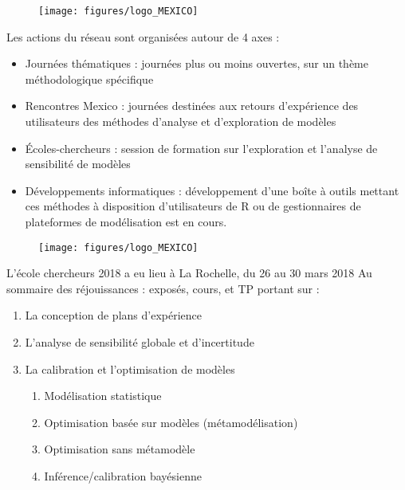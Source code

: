 \documentclass[10pt]{beamer}
\begin{document}
\begin{frame}{}

\begin{figure}
	\centering
	\texttt{[image: figures/logo\_MEXICO]}
	\label{fig:logomexico}
\end{figure}

Les actions du réseau sont organisées autour de 4 axes :

\begin{itemize}
	\item Journées thématiques : journées plus ou moins ouvertes, sur un thème méthodologique spécifique
	\item Rencontres Mexico : journées destinées aux retours d'expérience des utilisateurs des méthodes d'analyse et d'exploration de modèles
	\item Écoles-chercheurs : session de formation sur l'exploration et l'analyse de sensibilité de modèles
	\item Développements informatiques : développement d'une boîte à outils mettant ces méthodes à disposition d'utilisateurs de R ou de gestionnaires de plateformes de modélisation est en cours.
\end{itemize}

\end{frame}

\begin{frame}{}

\begin{figure}
	\centering
	\texttt{[image: figures/logo\_MEXICO]}
	\label{fig:logomexico}
\end{figure}

L'école chercheurs 2018 a eu lieu à La Rochelle, du 26 au 30 mars 2018 
Au sommaire des réjouissances : exposés, cours, et TP portant sur :

\begin{enumerate}
	\item La conception de plans d'expérience
	\item L'analyse de sensibilité globale et d'incertitude
	\item La calibration et l'optimisation de modèles
	\begin{enumerate}
		\item Modélisation statistique
		\item Optimisation basée sur modèles (métamodélisation)
		\item Optimisation sans métamodèle
		\item Inférence/calibration bayésienne
	\end{enumerate}
\end{enumerate}

\end{frame}
\end{document}
